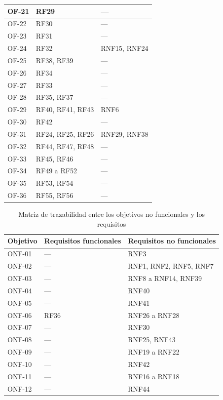 {\begin{longtable}{|p{2.9cm}|>{\raggedright\arraybackslash}p{5.2cm}|>{\raggedright\arraybackslash}p{5.2cm}|}
	\hline
	OF-21 & RF29 & --- \\
	\hline
	OF-22 & RF30 & --- \\
	\hline
	OF-23 & RF31 & --- \\
	\hline
	OF-24 & RF32 & RNF15, RNF24 \\
	\hline
	OF-25 & RF38, RF39 & --- \\
	\hline
	OF-26 & RF34 & --- \\
	\hline
	OF-27 & RF33 & --- \\
	\hline
	OF-28 & RF35, RF37 & --- \\
	\hline
	OF-29 & RF40, RF41, RF43 & RNF6 \\
	\hline
	OF-30 & RF42 & --- \\
	\hline
	OF-31 & RF24, RF25, RF26 & RNF29, RNF38 \\
	\hline
	OF-32 & RF44, RF47, RF48 & --- \\
	\hline
	OF-33 & RF45, RF46 & --- \\
	\hline
	OF-34 & RF49 a RF52 & --- \\
	\hline
	OF-35 & RF53, RF54 & --- \\
	\hline
	OF-36 & RF55, RF56 & --- \\
	\hline
\end{longtable}}

\begin{table}[H]
	\centering
	\renewcommand{\arraystretch}{1.4}
	\small
	\begin{tabular}{|p{2.9cm}|>{\raggedright\arraybackslash}p{5.2cm}|>{\raggedright\arraybackslash}p{5.2cm}|}
		\hline
		\textbf{Objetivo} & \textbf{Requisitos funcionales} & \textbf{Requisitos no funcionales} \\
		\hline
		ONF-01 & --- & RNF3 \\
		\hline
		ONF-02 & --- & RNF1, RNF2, RNF5, RNF7 \\
		\hline
		ONF-03 & --- & RNF8 a RNF14, RNF39 \\
		\hline
		ONF-04 & --- & RNF40 \\
		\hline
		ONF-05 & --- & RNF41 \\
		\hline
		ONF-06 & RF36 & RNF26 a RNF28 \\
		\hline
		ONF-07 & --- & RNF30 \\
		\hline
		ONF-08 & --- & RNF25, RNF43 \\
		\hline
		ONF-09 & --- & RNF19 a RNF22 \\
		\hline
		ONF-10 & --- & RNF42 \\
		\hline
		ONF-11 & --- & RNF16 a RNF18 \\
		\hline
		ONF-12 & --- & RNF44 \\
		\hline
	\end{tabular}
	\caption{Matriz de trazabilidad entre los objetivos no funcionales y los requisitos}
	\label{tab:trazabilidad-onf}
\end{table}

